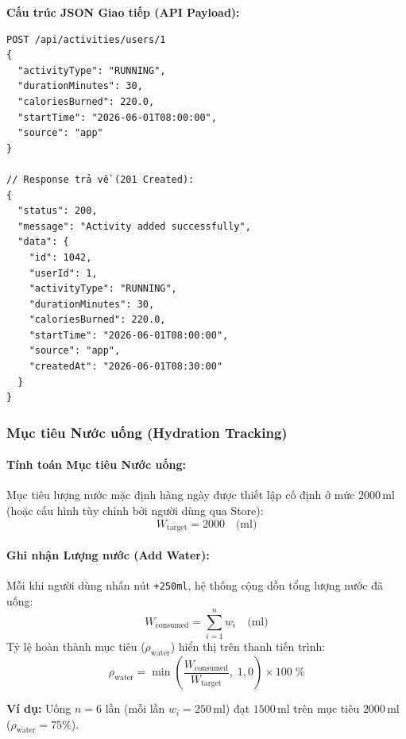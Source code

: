 \documentclass[12pt,a4paper]{article}
\begin{document}
\noindent\textbf{Cấu trúc JSON Giao tiếp (API Payload):}
\begin{verbatim}
POST /api/activities/users/1
{
  "activityType": "RUNNING",
  "durationMinutes": 30,
  "caloriesBurned": 220.0,
  "startTime": "2026-06-01T08:00:00",
  "source": "app"
}

// Response trả về (201 Created):
{
  "status": 200,
  "message": "Activity added successfully",
  "data": {
    "id": 1042,
    "userId": 1,
    "activityType": "RUNNING",
    "durationMinutes": 30,
    "caloriesBurned": 220.0,
    "startTime": "2026-06-01T08:00:00",
    "source": "app",
    "createdAt": "2026-06-01T08:30:00"
  }
}
\end{verbatim}

\subsubsection{Mục tiêu Nước uống (Hydration Tracking)}

\paragraph{Tính toán Mục tiêu Nước uống:}
Mục tiêu lượng nước mặc định hàng ngày được thiết lập cố định ở mức $2000$\,ml (hoặc cấu hình tùy chỉnh bởi người dùng qua Store):
\begin{equation}
    W_{\text{target}} = 2000 \quad \text{(ml)}
\end{equation}

\paragraph{Ghi nhận Lượng nước (Add Water):}
Mỗi khi người dùng nhấn nút \texttt{+250ml}, hệ thống cộng dồn tổng lượng nước đã uống:
\begin{equation}
    W_{\text{consumed}} = \sum_{i=1}^{n} w_i \quad \text{(ml)}
\end{equation}
Tỷ lệ hoàn thành mục tiêu ($\rho_{\text{water}}$) hiển thị trên thanh tiến trình:
\begin{equation}
    \rho_{\text{water}} = \min\!\left(\frac{W_{\text{consumed}}}{W_{\text{target}}},\; 1{,}0\right) \times 100\;\%
\end{equation}

\noindent\textbf{Ví dụ:} Uống $n=6$ lần (mỗi lần $w_i = 250\,\text{ml}$) đạt $1500\,\text{ml}$ trên mục tiêu $2000\,\text{ml}$ ($\rho_{\text{water}} = 75\%$).
\end{document}
